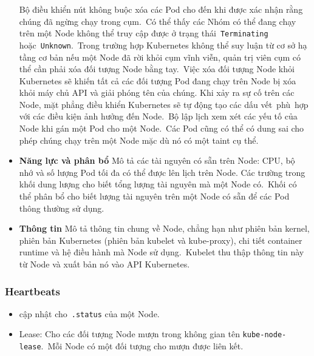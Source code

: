 \documentclass[12pt,a4paper]{report}
\begin{document}
\begin{itemize}
		\smallskip
		\subitem Bộ điều khiển nút không buộc xóa các Pod cho đến khi được xác nhận rằng chúng đã ngừng chạy trong cụm. Có thể thấy các Nhóm có thể đang chạy trên một Node không thể truy cập được ở trạng thái \texttt{Terminating} hoặc \texttt{Unknown}. Trong trường hợp Kubernetes không thể suy luận từ cơ sở hạ tầng cơ bản nếu một Node đã rời khỏi cụm vĩnh viễn, quản trị viên cụm có thể cần phải xóa đối tượng Node bằng tay. Việc xóa đối tượng Node khỏi Kubernetes sẽ khiến tất cả các đối tượng Pod đang chạy trên Node bị xóa khỏi máy chủ API và giải phóng tên của chúng.
		\smallskip
		\subitem Khi xảy ra sự cố trên các Node, mặt phẳng điều khiển Kubernetes sẽ tự động tạo các dấu vết phù hợp với các điều kiện ảnh hưởng đến Node. Bộ lập lịch xem xét các yếu tố của Node khi gán một Pod cho một Node. Các Pod cũng có thể có dung sai cho phép chúng chạy trên một Node mặc dù nó có một taint cụ thể.
		\smallskip
		\item \textbf{Năng lực và phân bổ}
		\smallskip
		\subitem Mô tả các tài nguyên có sẵn trên Node: CPU, bộ nhớ và số lượng Pod tối đa có thể được lên lịch trên Node.
		\smallskip
		\subitem Các trường trong khối dung lượng cho biết tổng lượng tài nguyên mà một Node có. Khối có thể phân bổ cho biết lượng tài nguyên trên một Node có sẵn để các Pod thông thường sử dụng.
		\smallskip
		\item \textbf{Thông tin}
		\smallskip
		\subitem Mô tả thông tin chung về Node, chẳng hạn như phiên bản kernel, phiên bản Kubernetes (phiên bản kubelet và kube-proxy), chi tiết container runtime và hệ điều hành mà Node sử dụng. Kubelet thu thập thông tin này từ Node và xuất bản nó vào API Kubernetes.
	\end{itemize}
	
	\subsubsection{Heartbeats}
	
	\hspace{1cm}{Heartbeats, được gửi bởi các Node Kubernetes, giúp cụm xác định tính khả dụng của từng Node và thực hiện hành động khi phát hiện lỗi.\\}
	
	\hspace{0.3cm}{Đối với các Node có hai dạng Heartbeats:}
	\begin{itemize}
		\item cập nhật cho \texttt{.status} của một Node.
		\item Lease: Cho các đối tượng Node mượn trong không gian tên \texttt{kube-node-lease}. Mỗi Node có một đối tượng cho mượn được liên kết.
	\end{itemize}
	
\end{document}
